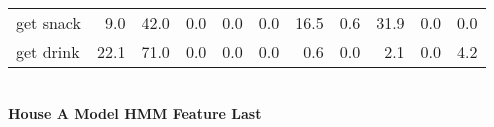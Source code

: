 \documentclass{article}
\begin{document}
\begin{sideways}
\begin{tabular}{lrrrrrrrrrr}
get snack         &         9.0 &               42.0 &               0.0 &                0.0 &                0.0 &             16.5 &                      0.6 &                  31.9 &              0.0 &              0.0 \\
get drink         &        22.1 &               71.0 &               0.0 &                0.0 &                0.0 &              0.6 &                      0.0 &                   2.1 &              0.0 &              4.2 \\
\bottomrule
\end{tabular}
\end{sideways}
\normalsize
\vspace{1cm}\\
\textbf{House A Model HMM Feature Last}\\
\vspace{1cm}\\
\end{document}
